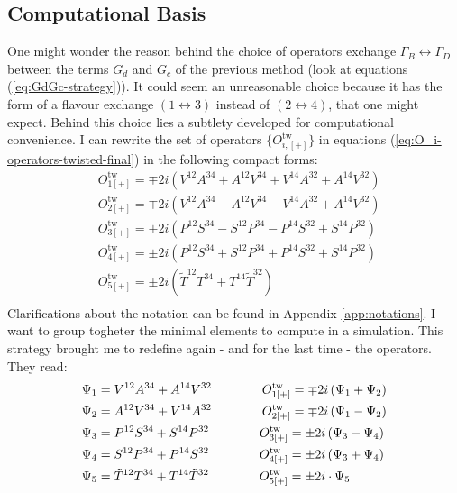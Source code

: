 \documentclass[english, LaM, oneside, noexaminfo]{sapthesis}
\begin{document}
\subsection{Computational Basis}
\noindent
One might wonder the reason behind the choice of operators exchange $\Gamma_B \leftrightarrow \Gamma_D$ between the terms $G_d$ and $G_c$ of the previous method (look at equations (\ref{eq:GdGc-strategy})).
It could seem an unreasonable choice because it has the form of a flavour exchange $(1\leftrightarrow 3)$ instead of $(2\leftrightarrow 4)$, that one might expect.
Behind this choice lies a subtlety developed for computational convenience.
\newline
I can rewrite the set of operators $\{O_{i,[+]}^\text{tw}\}$ in equations (\ref{eq:O_i-operators-twisted-final}) in the following compact forms:
\begin{equation}
    \begin{split}
        & O_{1[+]}^\text{tw} = \mp 2i \left( V^{12}A^{34} + A^{12}V^{34} + V^{14}A^{32} + A^{14}V^{32} \right) \\
        & O_{2[+]}^\text{tw} = \mp 2i \left( V^{12}A^{34} - A^{12}V^{34} - V^{14}A^{32} + A^{14}V^{32} \right) \\
        & O_{3[+]}^\text{tw} = \pm 2i \left( P^{12}S^{34} - S^{12}P^{34} - P^{14}S^{32} + S^{14}P^{32} \right) \\
        & O_{4[+]}^\text{tw} = \pm 2i \left( P^{12}S^{34} + S^{12}P^{34} + P^{14}S^{32} + S^{14}P^{32} \right) \\
        & O_{5[+]}^\text{tw} = \pm 2i \left( \tilde{T}^{12}T^{34} + T^{14}\tilde{T}^{32} \right) \\
    \end{split}
\end{equation}
Clarifications about the notation can be found in Appendix \ref{app:notations}.
I want to group togheter the minimal elements to compute in a simulation.
This strategy brought me to redefine again - and for the last time - the operators.
They read:
\begin{equation*}
    \begin{split}
        & \Psi_{1} =  V^{12}A^{34} + A^{14}V^{32} \hspace*{40pt} O_{1[+]}^\text{tw} = \mp 2i \left( \Psi_{1} + \Psi_{2} \right) \\
        & \Psi_{2} =  A^{12}V^{34} + V^{14}A^{32} \hspace*{40pt} O_{2[+]}^\text{tw} = \mp 2i \left( \Psi_{1} - \Psi_{2} \right) \\
        & \Psi_{3} =  P^{12}S^{34} + S^{14}P^{32} \hspace*{40pt} O_{3[+]}^\text{tw} = \pm 2i \left( \Psi_{3} - \Psi_{4} \right) \\
        & \Psi_{4} =  S^{12}P^{34} + P^{14}S^{32} \hspace*{40pt} O_{4[+]}^\text{tw} = \pm 2i \left( \Psi_{3} + \Psi_{4} \right) \\
        & \Psi_{5} =  \tilde{T}^{12}T^{34} + T^{14}\tilde{T}^{32} \hspace*{40pt} O_{5[+]}^\text{tw} = \pm 2i \cdot \Psi_{5} \\
    \end{split}
\end{equation*}
\end{document}
